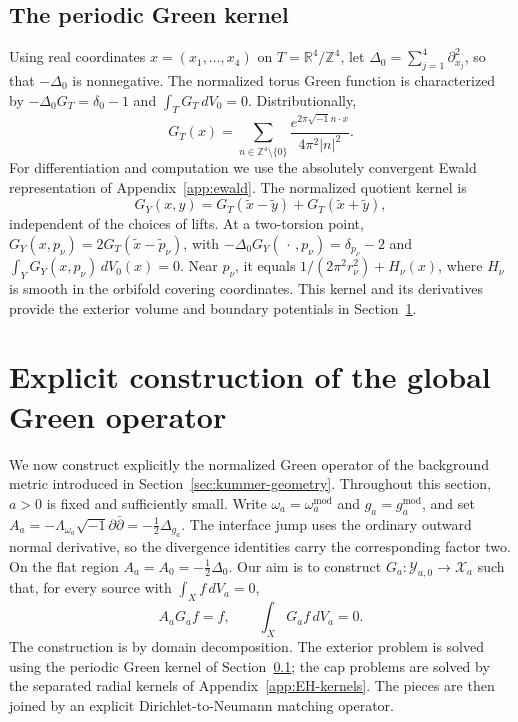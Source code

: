 \documentclass[11pt,a4paper,twoside]{article}
\numberwithin{equation}{section}
\newcommand{\ddc}{\sqrt{-1}\partial\bar\partial}
\theoremstyle{definition}
\theoremstyle{remark}
\newcommand{\ii}{\sqrt{-1}}
\begin{document}
\subsection{The periodic Green kernel}
\label{subsec:periodic-green}
Using real coordinates \(x=(x_1,\ldots,x_4)\) on \(T=\mathbb R^4/\mathbb Z^4\),
let \(\Delta_0=\sum_{j=1}^4\partial_{x_j}^2\), so that
\(-\Delta_0\) is nonnegative. The normalized torus Green
function is characterized by \(-\Delta_0G_T=\delta_0-1\)
and \(\int_TG_T\,dV_0=0\). Distributionally,
\[
G_T(x)=\sum_{n\in\mathbb Z^4\setminus\{0\}}
\frac{e^{2\pi\ii n\cdot x}}{4\pi^2|n|^2}.
\]
For differentiation and computation we use the absolutely
convergent Ewald representation of Appendix~\ref{app:ewald}.
The normalized quotient kernel is
\begin{equation}\label{eq:GY-general}
G_Y(x,y)=G_T(\widetilde x-\widetilde y)
+G_T(\widetilde x+\widetilde y),
\end{equation}
independent of the choices of lifts. At a two-torsion point,
\(G_Y(x,p_\nu)=2G_T(\widetilde x-\widetilde p_\nu)\), with
\(-\Delta_0G_Y(\,\cdot\,,p_\nu)=\delta_{p_\nu}-2\) and
\(\int_YG_Y(x,p_\nu)\,dV_0(x)=0\). Near \(p_\nu\),
it equals \(1/(2\pi^2r_\nu^2)+H_\nu(x)\), where \(H_\nu\)
is smooth in the orbifold covering coordinates. This kernel and its derivatives provide the exterior
volume and boundary potentials in Section~\ref{sec:green-construction}.

\section{Explicit construction of the global Green operator}
\label{sec:green-construction}

We now construct explicitly the normalized Green operator of the
background metric introduced in Section~\ref{sec:kummer-geometry}.
Throughout this section, \(a>0\) is fixed and sufficiently small.
Write \(\omega_a=\omega_a^{\mathrm{mod}}\) and
\(g_a=g_a^{\mathrm{mod}}\), and set
\(A_a=-\Lambda_{\omega_a}\ddc=-\tfrac12\Delta_{g_a}\).
The interface jump uses the ordinary outward normal derivative,
so the divergence identities carry the corresponding factor two.
On the flat region \(A_a=A_0=-\tfrac12\Delta_0\).
Our aim is to construct \(G_a:\mathcal Y_{a,0}\to\mathcal X_a\)
such that, for every source with \(\int_Xf\,dV_a=0\),
\[
A_aG_af=f,\qquad \int_XG_af\,dV_a=0.
\]
The construction is by domain decomposition.  The exterior problem is
solved using the periodic Green kernel of
Section~\ref{subsec:periodic-green}; the cap problems are solved by
the separated radial kernels of Appendix~\ref{app:EH-kernels}.  The
pieces are then joined by an explicit Dirichlet-to-Neumann matching
operator.
\end{document}
